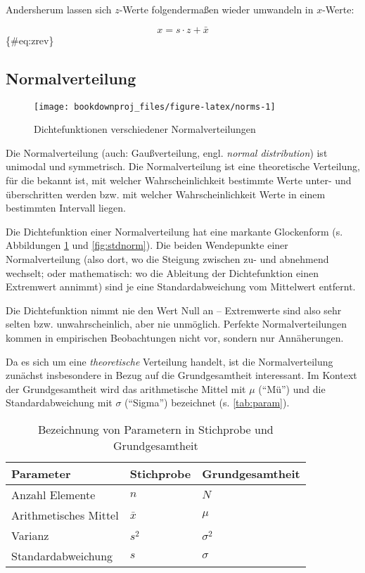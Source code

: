 \documentclass[
  ngerman,
]{article}
\begin{document}
Andersherum lassen sich \(z\)-Werte folgendermaßen wieder umwandeln in \(x\)-Werte:

\[
  x=s\cdot z+\bar{x}
\]\{\#eq:zrev\}

\hypertarget{normalverteilung}{%
\subsection{Normalverteilung}\label{normalverteilung}}

\begin{figure}[b]

{\centering \texttt{[image: bookdownproj\_files/figure-latex/norms-1]} 

}

\caption{Dichtefunktionen verschiedener Normalverteilungen}\label{fig:norms}
\end{figure}

Die Normalverteilung (auch: Gaußverteilung, engl. \emph{normal distribution}) ist unimodal und symmetrisch. Die Normalverteilung ist eine theoretische Verteilung, für die bekannt ist, mit welcher Wahrscheinlichkeit bestimmte Werte unter- und überschritten werden bzw. mit welcher Wahrscheinlichkeit Werte in einem bestimmten Intervall liegen.

Die Dichtefunktion einer Normalverteilung hat eine markante Glockenform (s. Abbildungen \ref{fig:norms} und \ref{fig:stdnorm}). Die beiden Wendepunkte einer Normalverteilung (also dort, wo die Steigung zwischen zu- und abnehmend wechselt; oder mathematisch: wo die Ableitung der Dichtefunktion einen Extremwert annimmt) sind je eine Standardabweichung vom Mittelwert entfernt.

Die Dichtefunktion nimmt nie den Wert Null an -- Extremwerte sind also sehr selten bzw. unwahrscheinlich, aber nie unmöglich. Perfekte Normalverteilungen kommen in empirischen Beobachtungen nicht vor, sondern nur Annäherungen.

Da es sich um eine \emph{theoretische} Verteilung handelt, ist die Normalverteilung zunächst insbesondere in Bezug auf die Grundgesamtheit interessant. Im Kontext der Grundgesamtheit wird das arithmetische Mittel mit \(\mu\) (``Mü'') und die Standardabweichung mit \(\sigma\) (``Sigma'') bezeichnet (s. \autoref{tab:param}).

\begin{table}[H]

\caption{\label{tab:param}Bezeichnung von Parametern in Stichprobe und Grundgesamtheit}
\centering
\begin{tabular}[t]{lll}
\toprule
Parameter & Stichprobe & Grundgesamtheit\\
\midrule
Anzahl Elemente & $n$ & $N$\\
Arithmetisches Mittel & $\bar{x}$ & $\mu$\\
Varianz & $s^2$ & $\sigma^2$\\
Standardabweichung & $s$ & $\sigma$\\
\bottomrule
\end{tabular}
\end{table}
\end{document}
